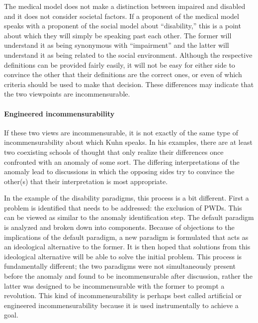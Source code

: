 \documentclass[a4paper]{article}
\begin{document}
The medical model does not make a distinction between impaired and disabled
and it does not consider societal factors. If a proponent of the medical model
speaks with a proponent of the social model about ``disability,'' this is a
point about which they will simply be speaking past each other. The former
will understand it as being synonymous with ``impairment'' and the latter will
understand it as being related to the social environment. Although the
respective definitions can be provided fairly easily, it will not be easy for
either side to convince the other that their definitions are the correct ones,
or even of which criteria should be used to make that decision. These
differences may indicate that the two viewpoints are incommensurable.

\paragraph{Engineered incommensurability}

If these two views are incommensurable, it is not exactly of the same type of
incommensurability about which Kuhn speaks. In his examples, there are at
least two coexisting schools of thought that only realize their differences
once confronted with an anomaly of some sort. The differing interpretations of
the anomaly lead to discussions in which the opposing sides try to convince
the other(s) that their interpretation is most appropriate.

In the example of the disability paradigms, this process is a bit different.
First a problem is identified that needs to be addressed: the exclusion of
PWDs. This can be viewed as similar to the anomaly identification step. The
default paradigm is analyzed and broken down into components. Because of
objections to the implications of the default paradigm, a new paradigm is
formulated that acts as an ideological alternative to the former. It is then
hoped that solutions from this ideological alternative will be able to solve
the initial problem. This process is fundamentally different; the two
paradigms were not simultaneously present before the anomaly and found to be
incommensurable after discussion, rather the latter was designed to be
incommensurable with the former to prompt a revolution. This kind of
incommensurability is perhaps best called artificial or engineered
incommensurability because it is used instrumentally to achieve a goal.
\end{document}
